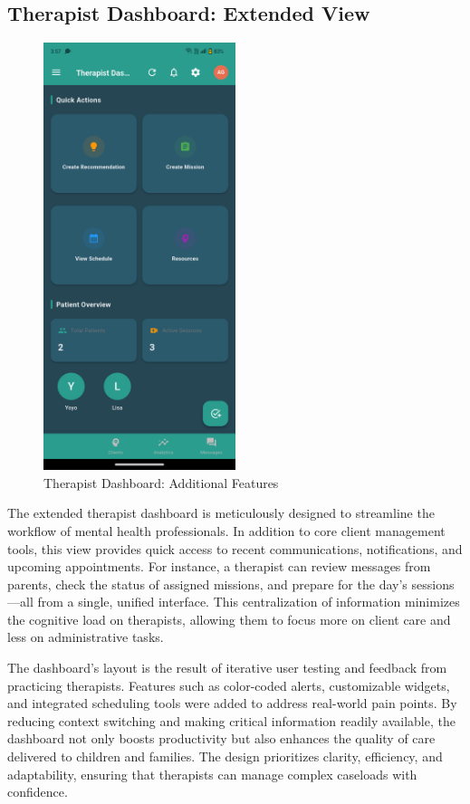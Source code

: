 \documentclass[12pt,a4paper]{article}
\newcommand{\sectiontitle}[1]{\subsection{#1}}
\begin{document}
\sectiontitle{Therapist Dashboard: Extended View}

\begin{figure}[H]
    \centering
    \includegraphics[width=0.5\textwidth]{Screenshots/restoftherapistdashboard.png}
    \caption{Therapist Dashboard: Additional Features}
    \label{fig:rest-therapist-dashboard}
\end{figure}
The extended therapist dashboard is meticulously designed to streamline the workflow of mental health professionals. In addition to core client management tools, this view provides quick access to recent communications, notifications, and upcoming appointments. For instance, a therapist can review messages from parents, check the status of assigned missions, and prepare for the day's sessions—all from a single, unified interface. This centralization of information minimizes the cognitive load on therapists, allowing them to focus more on client care and less on administrative tasks.

The dashboard's layout is the result of iterative user testing and feedback from practicing therapists. Features such as color-coded alerts, customizable widgets, and integrated scheduling tools were added to address real-world pain points. By reducing context switching and making critical information readily available, the dashboard not only boosts productivity but also enhances the quality of care delivered to children and families. The design prioritizes clarity, efficiency, and adaptability, ensuring that therapists can manage complex caseloads with confidence.
\end{document}
